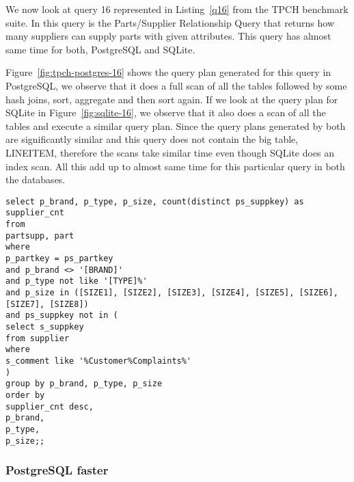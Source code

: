 We now look at query 16 represented in Listing~\ref{q16} from the TPCH benchmark suite. In this query is the Parts/Supplier Relationship Query that returns how many suppliers can supply parts with given attributes. This query has almost same time for both, PostgreSQL and SQLite.

Figure~\ref{fig:tpch-postgres-16} shows the query plan generated for this query in PostgreSQL, we observe that it does a full scan of all the tables followed by some hash joins, sort, aggregate and then sort again. If we look at the query plan for SQLite in Figure~\ref{fig:sqlite-16}, we observe that it also does a scan of all the tables and execute a similar query plan. Since the query plans generated by both are significantly similar and this query does not contain the big table, LINEITEM, therefore the scans take similar time even though SQLite does an index scan. All this add up to almost same time for this particular query in both the databases.\\

\begin{minipage}{\linewidth}
\begin{lstlisting}[breaklines=true, numbers=none, label=q16, caption=Query 16]
select p_brand, p_type, p_size, count(distinct ps_suppkey) as supplier_cnt
from
partsupp, part
where
p_partkey = ps_partkey
and p_brand <> '[BRAND]'
and p_type not like '[TYPE]%'
and p_size in ([SIZE1], [SIZE2], [SIZE3], [SIZE4], [SIZE5], [SIZE6], [SIZE7], [SIZE8])
and ps_suppkey not in (
select s_suppkey
from supplier
where
s_comment like '%Customer%Complaints%'
)
group by p_brand, p_type, p_size
order by
supplier_cnt desc,
p_brand,
p_type,
p_size;;
\end{lstlisting}
\end{minipage}






\subsubsection{PostgreSQL faster}

